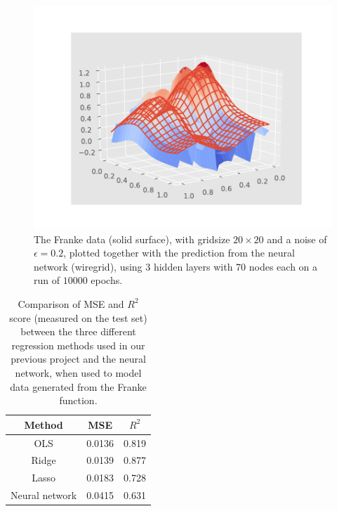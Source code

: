 \begin{figure}
    \centering
    \includegraphics[scale=0.7]{Figures/Regression/nn_franke_optimal_n20.pdf}
    \caption{The Franke data (solid surface), with gridsize $20 \times 20$ and a noise of $\epsilon=0.2$, plotted together with the prediction from the neural network (wiregrid), using 3 hidden layers with 70 nodes each on a run of $10000$ epochs. }
    \label{fig:franke20}
\end{figure}

\begin{table}[]
    \centering
    \caption{Comparison of MSE and $R^2$ score (measured on the test set) between the three different regression methods used in our previous project\cite{project1} and the neural network, when used to model data generated from the Franke function.}
    \begin{tabular}{|c|c|c|}
        \hline
        Method          & MSE       & $R^2$ \\
        \hline
        OLS             &  0.0136   & 0.819  \\ 
        \hline
        Ridge           & 0.0139    & 0.877  \\ 
        \hline
        Lasso           & 0.0183    & 0.728  \\
        \hline
        Neural network  &    0.0415   & 0.631 \\
        \hline
    \end{tabular}
    \label{tab:regression}
\end{table}


